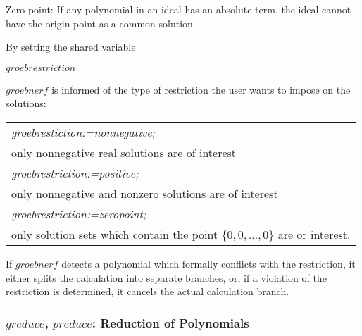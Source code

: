 Zero point:  If any polynomial in an ideal has an absolute term, the ideal
cannot have the origin point as a common solution.

By setting the shared variable
\begin{center} $groebrestriction$ \end{center}
$groebnerf$ is informed of the type of restriction the user wants to
impose on the solutions:
\begin{center}
\begin{tabular}{l}
{\it groebrestiction:=nonnegative;} \\
\hspace*{+.5cm} only nonnegative real solutions are of
interest\vspace*{4mm} \\
{\it groebrestriction:=positive;} \\
\hspace*{+.5cm}only nonnegative and nonzero solutions are of
interest\vspace*{4mm} \\
{\it groebrestriction:=zeropoint;} \\
\hspace*{+.5cm}only solution sets which contain the point
$\{0,0,\ldots,0\}$ are or interest.
\end{tabular}
\end{center}

If $groebnerf$ detects a polynomial which formally conflicts with the
restriction, it either splits the calculation into separate branches, or,
if a violation of the restriction is determined, it cancels the actual
calculation branch.

\subsubsection{$greduce$, $preduce$: Reduction of Polynomials}

